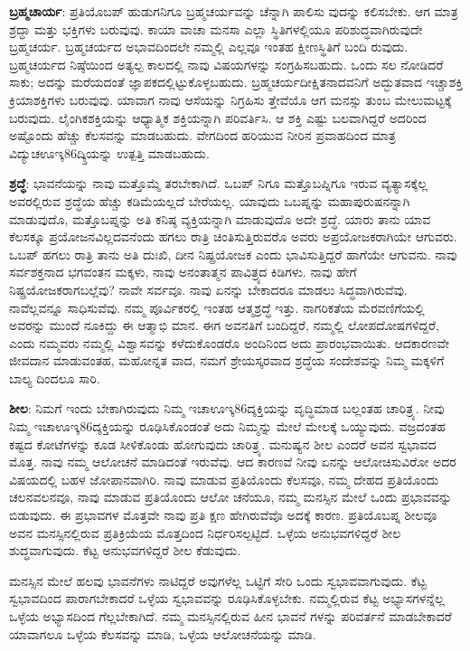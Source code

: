 \textbf{ಬ್ರಹ್ಮಚಾರ್ಯ}: ಪ್ರತಿಯೊಬಪ್ ಹುಡುಗನಿಗೂ ಬ್ರಹ್ಮಚರ್ಯವನ್ನು ಚೆನ್ನಾಗಿ ಪಾಲಿಸು ವುದನ್ನು ಕಲಿಸಬೇಕು. ಆಗ ಮಾತ್ರ ಶ್ರದ್ಧಾ ಮತ್ತು ಭಕ್ತಿಗಳು ಬರುವುವು. ಕಾಯಾ ವಾಚಾ ಮನಸಾ ಎಲ್ಲಾ ಸ್ಥಿತಿಗಳಲ್ಲಿಯೂ ಪರಿಶುದ್ಧವಾಗಿರುವುದೇ ಬ್ರಹ್ಮಚರ್ಯ. ಬ್ರಹ್ಮಚರ್ಯದ ಅಭಾವದಿಂದಲೇ ನಮ್ಮಲ್ಲಿ ಎಲ್ಲವೂ ಇಂತಹ ಕ್ಷೀಣಸ್ಥಿತಿಗೆ ಬಂದಿ ರುವುದು. ಬ್ರಹ್ಮಚರ್ಯದ ನಿಷ್ಠೆಯಿಂದ ಅತ್ಯಲ್ಪ ಕಾಲದಲ್ಲಿ ನಾವು ವಿಷಯಗಳನ್ನು ಸಂಗ್ರಹಿಸಬಹುದು. ಒಂದು ಸಲ ನೋಡಿದರೆ ಸಾಕು; ಅದನ್ನು ಮರೆಯದಂತೆ ಜ್ಞಾಪಕದಲ್ಲಿಟ್ಟುಕೊಳ್ಳಬಹುದು. ಬ್ರಹ್ಮಚರ್ಯದೀಕ್ಷಿತನಾದವನಿಗೆ ಅದ್ಭುತವಾದ ಇಚ್ಚಾಶಕ್ತಿ ಕ್ರಿಯಾಶಕ್ತಿಗಳು ಬರುವುವು. ಯಾವಾಗ ನಾವು ಆಸೆಯನ್ನು ನಿಗ್ರಹಿಸು ತ್ತೇವೆಯೊ ಆಗ ಮನಸ್ಸು ತುಂಬ ಮೇಲುಮಟ್ಟಕ್ಕೆ ಬರುವುದು. ಲೈಂಗಿಕಶಕ್ತಿಯನ್ನು ಆಧ್ಯಾತ್ಮಿಕ ಶಕ್ತಿಯನ್ನಾಗಿ ಪರಿವರ್ತಿಸಿ. ಆ ಶಕ್ತಿ ಎಷ್ಟು ಬಲವಾಗಿದ್ದರೆ ಅದರಿಂದ ಅಷ್ಟೊಂದು ಹೆಚ್ಚು ಕೆಲಸವನ್ನು ಮಾಡಬಹುದು. ವೇಗದಿಂದ ಹರಿಯುವ ನೀರಿನ ಪ್ರವಾಹದಿಂದ ಮಾತ್ರ ವಿದ್ಯುಚಊಇ್ಕ86ದ್ಕ್ತಿಯನ್ನು ಉತ್ಪತ್ತಿ ಮಾಡಬಹುದು.

\textbf{ಶ್ರದ್ಧೆ}: ಭಾವನೆಯನ್ನು ನಾವು ಮತ್ತೊಮ್ಮೆ ತರಬೇಕಾಗಿದೆ. ಒಬಪ್ ನಿಗೂ ಮತ್ತೊಬಪ್ನಿಗೂ ಇರುವ ವ್ಯತ್ಯಾಸಕ್ಕೆಲ್ಲ ಅವರಲ್ಲಿರುವ ಶ್ರದ್ಧೆಯ ಹೆಚ್ಚು ಕಡಿಮೆಯಲ್ಲದೆ ಬೇರೆಯಲ್ಲ. ಯಾವುದು ಒಬಪ್ನನ್ನು ಮಹಾಪುರುಷನನ್ನಾಗಿ ಮಾಡುವುದೊ, ಮತ್ತೊಬಪ್ನನ್ನು ಅತಿ ಕನಿಷ್ಠ ವ್ಯಕ್ತಿಯನ್ನಾಗಿ ಮಾಡುವುದೊ ಅದೇ ಶ್ರದ್ಧೆ. ಯಾರು ತಾನು ಯಾವ ಕೆಲಸಕ್ಕೂ ಪ್ರಯೋಜನವಿಲ್ಲದವನೆಂದು ಹಗಲು ರಾತ್ರಿ ಚಿಂತಿಸುತ್ತಿರುವರೊ ಅವರು ಅಪ್ರಯೋಜಕರಾಗಿಯೇ ಆಗುವರು. ಒಬಪ್ ಹಗಲು ರಾತ್ರಿ ತಾನು ಅತಿ ದುಃಖಿ, ದೀನ ನಿಷ್ಪ್ರಯೋಜಕ ಎಂದು ಭಾವಿಸುತ್ತಿದ್ದರೆ ಹಾಗೆಯೇ ಆಗುವನು. ನಾವು ಸರ್ವಶಕ್ತನಾದ ಭಗವಂತನ ಮಕ್ಕಳು, ನಾವು ಅನಂತಾತ್ಮನ ಪಾವಿತ್ರ್ಯದ ಕಿಡಿಗಳು. ನಾವು ಹೇಗೆ ನಿಷ್ಪ್ರಯೋಜಕರಾಗಬಲ್ಲೆವು? ನಾವೇ ಸರ್ವವೂ. ನಾವು ಏನನ್ನು ಬೇಕಾದರೂ ಮಾಡಲು ಸಿದ್ಧವಾಗಿರುವೆವು. ನಾವೆಲ್ಲವನ್ನೂ ಸಾಧಿಸುವೆವು. ನಮ್ಮ ಪೂರ್ವಿಕರಲ್ಲಿ ಇಂತಹ ಆತ್ಮಶ್ರದ್ಧೆ ಇತ್ತು. ನಾಗರಿಕತೆಯ ಮೆರವಣಿಗೆಯಲ್ಲಿ ಅವರನ್ನು ಮುಂದೆ ನೂಕಿದ್ದು ಈ ಆತ್ಮಾಭಿ ಮಾನ. ಈಗ ಅವನತಿಗೆ ಬಂದಿದ್ದರೆ, ನಮ್ಮಲ್ಲಿ ಲೋಪದೋಷಗಳಿದ್ದರೆ, ಎಂದು ನಮ್ಮವರು ನಮ್ಮಲ್ಲಿ ವಿಶ್ವಾಸವನ್ನು ಕಳೆದುಕೊಂಡರೊ ಅಂದಿನಿಂದ ಅದು ಪ್ರಾರಂಭವಾಯಿತು. ಆದಕಾರಣವೇ ಜೀವದಾನ ಮಾಡುವಂತಹ, ಮಹೋನ್ನತ ವಾದ, ನಮಗೆ ಶ್ರೇಯಸ್ಕರವಾದ ಶ್ರದ್ಧೆಯ ಸಂದೇಶವನ್ನು ನಿಮ್ಮ ಮಕ್ಕಳಿಗೆ ಬಾಲ್ಯ ದಿಂದಲೂ ಸಾರಿ.

\textbf{ಶೀಲ}: ನಿಮಗೆ ಇಂದು ಬೇಕಾಗಿರುವುದು ನಿಮ್ಮ ಇಚಾಊಇ್ಕ86ದ್ಶಕ್ತಿಯನ್ನು ವೃದ್ಧಿಮಾಡ ಬಲ್ಲಂತಹ ಚಾರಿತ್ರ್ಯ. ನೀವು ನಿಮ್ಮ ಇಚಾಊಇ್ಕ86ದ್ಶಕ್ತಿಯನ್ನು ರೂಢಿಸಿಕೊಂಡಂತೆ ಅದು ನಿಮ್ಮನ್ನು ಮೇಲೆ ಮೇಲಕ್ಕೆ ಒಯ್ಯುವುದು. ವಜ್ರದಂತಹ ಕಷ್ಟದ ಕೋಟೆಗಳನ್ನು ಕೂಡ ಸೀಳಿಕೊಂಡು ಹೋಗುವುದು ಚಾರಿತ್ರ್ಯ. ಮನುಷ್ಯನ ಶೀಲ ಎಂದರೆ ಅವನ ಸ್ವಭಾವದ ಮೊತ್ತ. ನಾವು ನಮ್ಮ ಆಲೋಚನೆ ಮಾಡಿದಂತೆ ಇರುವೆವು. ಆದ ಕಾರಣವೆ ನೀವು ಏನನ್ನು ಆಲೋಚಿಸುವಿರೋ ಅದರ ವಿಷಯದಲ್ಲಿ ಬಹಳ ಜೋಪಾನವಾಗಿರಿ. ನಾವು ಮಾಡುವ ಪ್ರತಿಯೊಂದು ಕೆಲಸವೂ, ನಮ್ಮ ದೇಹದ ಪ್ರತಿಯೊಂದು ಚಲನವಲನವೂ, ನಾವು ಮಾಡುವ ಪ್ರತಿಯೊಂದು ಆಲೋ ಚನೆಯೂ, ನಮ್ಮ ಮನಸ್ಸಿನ ಮೇಲೆ ಒಂದು ಪ್ರಭಾವವನ್ನು ಬಿಡುವುದು. ಈ ಪ್ರಭಾವಗಳ ಮೊತ್ತವೇ ನಾವು ಪ್ರತಿ ಕ್ಷಣ ಹೇಗಿರುವೆವೊ ಅದಕ್ಕೆ ಕಾರಣ. ಪ್ರತಿಯೊಬಪ್ನ ಶೀಲವೂ ಅವನ ಮನಸ್ಸಿನಲ್ಲಿರುವ ಪ್ರತಿಕ್ರಿಯೆಯ ಮೊತ್ತದಿಂದ ನಿರ್ಧರಿಸಲ್ಪಟ್ಟಿದೆ. ಒಳ್ಳೆಯ ಅನುಭವಗಳಿದ್ದರೆ ಶೀಲ ಶುದ್ಧವಾಗುವುದು. ಕೆಟ್ಟ ಅನುಭವಗಳಿದ್ದರೆ ಶೀಲ ಕೆಡುವುದು.

ಮನಸ್ಸಿನ ಮೇಲೆ ಹಲವು ಭಾವನೆಗಳು ನಾಟಿದ್ದರೆ ಅವುಗಳೆಲ್ಲ ಒಟ್ಟಿಗೆ ಸೇರಿ ಒಂದು ಸ್ವಭಾವವಾಗುವುದು. ಕೆಟ್ಟ ಸ್ವಭಾವದಿಂದ ಪಾರಾಗಬೇಕಾದರೆ ಒಳ್ಳೆಯ ಸ್ವಭಾವವನ್ನು ರೂಢಿಸಿಕೊಳ್ಳಬೇಕು. ನಮ್ಮಲ್ಲಿರುವ ಕೆಟ್ಟ ಅಭ್ಯಾಸಗಳನ್ನೆಲ್ಲ ಒಳ್ಳೆಯ ಅಭ್ಯಾಸದಿಂದ ಗೆಲ್ಲಬೇಕಾಗಿದೆ. ನಮ್ಮ ಮನಸ್ಸಿನಲ್ಲಿರುವ ಹೀನ ಭಾವನೆ ಗಳನ್ನು ಪರಿವರ್ತನೆ ಮಾಡಬೇಕಾದರೆ ಯಾವಾಗಲೂ ಒಳ್ಳೆಯ ಕೆಲಸವನ್ನು ಮಾಡಿ, ಒಳ್ಳೆಯ ಆಲೋಚನೆಯನ್ನು ಮಾಡಿ.


